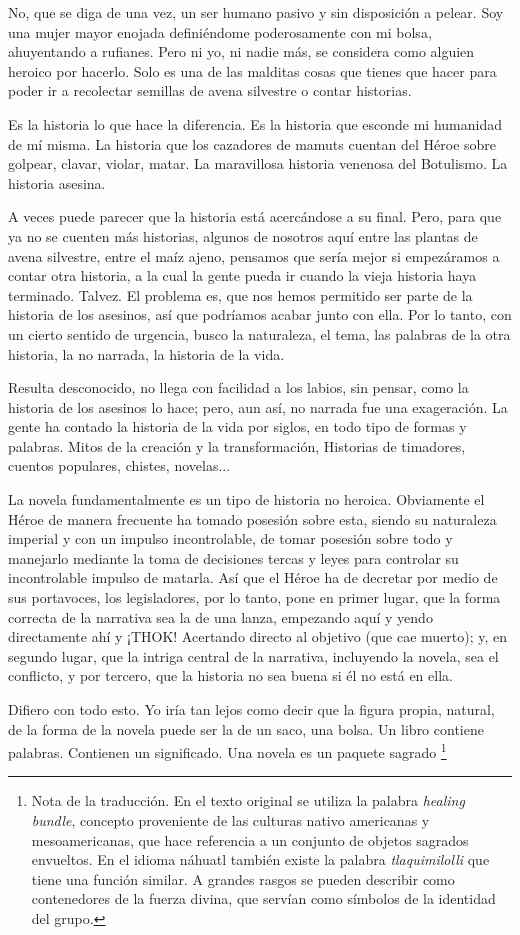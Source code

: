 No, que se diga de una vez, un ser humano pasivo
y sin disposición a pelear. Soy una mujer mayor
enojada definiéndome poderosamente con mi
bolsa, ahuyentando a rufianes. Pero ni yo, ni
nadie más, se considera como alguien heroico
por hacerlo. Solo es una de las malditas cosas que
tienes que hacer para poder ir a recolectar
semillas de avena silvestre o contar historias.

Es la historia lo que hace la diferencia. Es la
historia que esconde mi humanidad de mí misma.
La historia que los cazadores de mamuts cuentan
del Héroe sobre golpear, clavar, violar, matar. La
maravillosa historia venenosa del Botulismo. La
historia asesina.

A veces puede parecer que la historia está
acercándose a su final. Pero, para que ya no se
cuenten más historias, algunos de nosotros aquí
entre las plantas de avena silvestre, entre el maíz
ajeno, pensamos que sería mejor si empezáramos
a contar otra historia, a la cual la gente pueda ir
cuando la vieja historia haya terminado. Talvez.
El problema es, que nos hemos permitido ser
parte de la historia de los asesinos, así que
podríamos acabar junto con ella. Por lo tanto,
con un cierto sentido de urgencia, busco la
naturaleza, el tema, las palabras de la otra
historia, la no narrada, la historia de la vida.

Resulta desconocido, no llega con facilidad a los
labios, sin pensar, como la historia de los asesinos
lo hace; pero, aun así, no narrada fue una
exageración. La gente ha contado la historia de
la vida por siglos, en todo tipo de formas y
palabras. Mitos de la creación y la
transformación, Historias de timadores, cuentos
populares, chistes, novelas...

La novela fundamentalmente es un tipo de
historia no heroica. Obviamente el Héroe de
manera frecuente ha tomado posesión sobre
esta, siendo su naturaleza imperial y con un
impulso incontrolable, de tomar posesión sobre
todo y manejarlo mediante la toma de decisiones
tercas y leyes para controlar su incontrolable
impulso de matarla. Así que el Héroe ha de
decretar por medio de sus portavoces, los
legisladores, por lo tanto, pone en primer lugar,
que la forma correcta de la narrativa sea la de una
lanza, empezando aquí y yendo directamente ahí
y ¡THOK! Acertando directo al objetivo (que cae
muerto); y, en segundo lugar, que la intriga
central de la narrativa, incluyendo la novela, sea
el conflicto, y por tercero, que la historia no sea
buena si él no está en ella. 

Difiero con todo esto. Yo iría tan lejos como
decir que la figura propia, natural, de la forma de
la novela puede ser la de un saco, una bolsa. Un
libro contiene palabras.  Contienen un
significado. Una novela es un paquete sagrado \footnote{ 
    Nota de la traducción. En el texto original se utiliza
    la palabra \textit{healing bundle}, concepto proveniente de
    las culturas nativo americanas y mesoamericanas,
    que hace referencia a un conjunto de objetos
    sagrados envueltos. En el idioma náhuatl también
    existe la palabra \textit{tlaquimilolli} que tiene una función
    similar. A grandes rasgos se pueden describir como
    contenedores de la fuerza divina, que servían como
    símbolos de la identidad del grupo.
}

